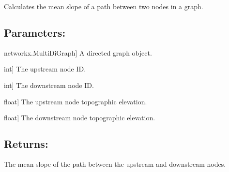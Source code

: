 \documentclass[letterpaper,10pt,english]{sphinxmanual}
\begin{document}
\begin{fulllineitems}
\label{\detokenize{pysewer:pysewer.helper.get_mean_slope}}
\pysigstartsignatures
{}
\pysigstopsignatures
\sphinxAtStartPar
Calculates the mean slope of a path between two nodes in a graph.


\subsection{Parameters:}
\label{\detokenize{pysewer:id3}}\begin{description}
\sphinxlineitem{G}{[}networkx.MultiDiGraph{]}
\sphinxAtStartPar
A directed graph object.

\sphinxlineitem{upstream}{[}int{]}
\sphinxAtStartPar
The upstream node ID.

\sphinxlineitem{downstream}{[}int{]}
\sphinxAtStartPar
The downstream node ID.

\sphinxlineitem{us\_td}{[}float{]}
\sphinxAtStartPar
The upstream node topographic elevation.

\sphinxlineitem{ds\_td}{[}float{]}
\sphinxAtStartPar
The downstream node topographic elevation.

\end{description}


\subsection{Returns:}
\label{\detokenize{pysewer:id4}}\begin{description}
\sphinxAtStartPar
The mean slope of the path between the upstream and downstream nodes.

\end{description}

\end{fulllineitems}

\end{document}
